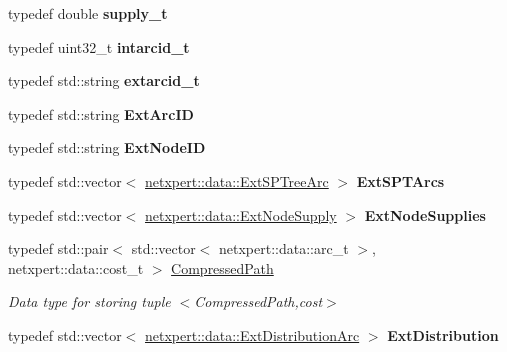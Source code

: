 \begin{DoxyCompactItemize}
\item 
typedef double {\bfseries supply\+\_\+t}\hypertarget{namespacenetxpert_1_1data_a6749d55daca0e36cf8f54343d1eea856}{}\label{namespacenetxpert_1_1data_a6749d55daca0e36cf8f54343d1eea856}

\item 
typedef uint32\+\_\+t {\bfseries intarcid\+\_\+t}\hypertarget{namespacenetxpert_1_1data_a0b5290d93ce5350d603f546702c6683a}{}\label{namespacenetxpert_1_1data_a0b5290d93ce5350d603f546702c6683a}

\item 
typedef std\+::string {\bfseries extarcid\+\_\+t}\hypertarget{namespacenetxpert_1_1data_a03f3f6333be4cd56b752fa5515e258ac}{}\label{namespacenetxpert_1_1data_a03f3f6333be4cd56b752fa5515e258ac}

\item 
typedef std\+::string {\bfseries Ext\+Arc\+ID}\hypertarget{namespacenetxpert_1_1data_a9e271a126af4583b08053f3ae9a3aa6f}{}\label{namespacenetxpert_1_1data_a9e271a126af4583b08053f3ae9a3aa6f}

\item 
typedef std\+::string {\bfseries Ext\+Node\+ID}\hypertarget{namespacenetxpert_1_1data_a1a5ff22f21f584b92c13d01a538207de}{}\label{namespacenetxpert_1_1data_a1a5ff22f21f584b92c13d01a538207de}

\item 
typedef std\+::vector$<$ \hyperlink{structnetxpert_1_1data_1_1ExtSPTreeArc}{netxpert\+::data\+::\+Ext\+S\+P\+Tree\+Arc} $>$ {\bfseries Ext\+S\+P\+T\+Arcs}\hypertarget{namespacenetxpert_1_1data_ae278e484c43ca214e75359296aae987d}{}\label{namespacenetxpert_1_1data_ae278e484c43ca214e75359296aae987d}

\item 
typedef std\+::vector$<$ \hyperlink{structnetxpert_1_1data_1_1ExtNodeSupply}{netxpert\+::data\+::\+Ext\+Node\+Supply} $>$ {\bfseries Ext\+Node\+Supplies}\hypertarget{namespacenetxpert_1_1data_aeaebc87bf812a39d680030d34cc3cec2}{}\label{namespacenetxpert_1_1data_aeaebc87bf812a39d680030d34cc3cec2}

\item 
typedef std\+::pair$<$ std\+::vector$<$ netxpert\+::data\+::arc\+\_\+t $>$, netxpert\+::data\+::cost\+\_\+t $>$ \hyperlink{namespacenetxpert_1_1data_a82e488b55f222a9759d73e24f6087033}{Compressed\+Path}\hypertarget{namespacenetxpert_1_1data_a82e488b55f222a9759d73e24f6087033}{}\label{namespacenetxpert_1_1data_a82e488b55f222a9759d73e24f6087033}

\begin{DoxyCompactList}\small\item\em Data type for storing tuple $<$Compressed\+Path,cost$>$ \end{DoxyCompactList}\item 
typedef std\+::vector$<$ \hyperlink{structnetxpert_1_1data_1_1ExtDistributionArc}{netxpert\+::data\+::\+Ext\+Distribution\+Arc} $>$ {\bfseries Ext\+Distribution}\hypertarget{namespacenetxpert_1_1data_a8058bc5e9730ee9f445cd6680a4fcddd}{}\label{namespacenetxpert_1_1data_a8058bc5e9730ee9f445cd6680a4fcddd}


\end{DoxyCompactItemize}
